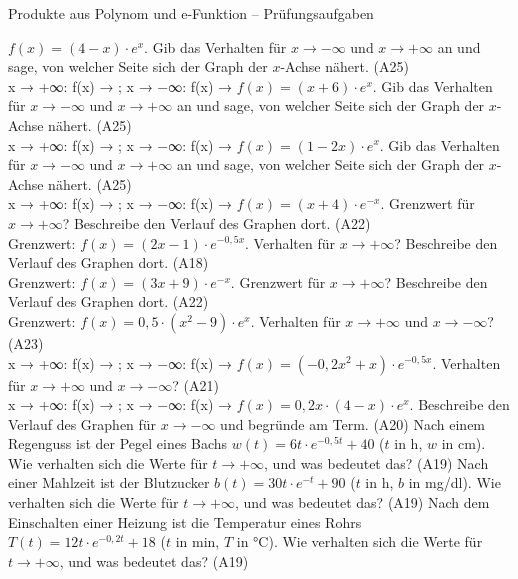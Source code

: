 \begin{aufgabe}{Produkte aus Polynom und e-Funktion – Prüfungsaufgaben}
\begin{teile}
\teil $f(x) = (4 - x) \cdot e^{x}$. Gib das Verhalten für $x \to -\infty$ und $x \to +\infty$ an und sage, von welcher Seite sich der Graph der $x$-Achse nähert. \hfill (A25) \\ x → +∞: f(x) → \leerfeld ; x → −∞: f(x) → \leerfeld
\teil $f(x) = (x + 6) \cdot e^{x}$. Gib das Verhalten für $x \to -\infty$ und $x \to +\infty$ an und sage, von welcher Seite sich der Graph der $x$-Achse nähert. \hfill (A25) \\ x → +∞: f(x) → \leerfeld ; x → −∞: f(x) → \leerfeld
\teil $f(x) = (1 - 2x) \cdot e^{x}$. Gib das Verhalten für $x \to -\infty$ und $x \to +\infty$ an und sage, von welcher Seite sich der Graph der $x$-Achse nähert. \hfill (A25) \\ x → +∞: f(x) → \leerfeld ; x → −∞: f(x) → \leerfeld
\teil $f(x) = (x + 4) \cdot e^{-x}$. Grenzwert für $x \to +\infty$? Beschreibe den Verlauf des Graphen dort. \hfill (A22) \\ Grenzwert: \leerfeld
\teil $f(x) = (2x - 1) \cdot e^{-0{,}5x}$. Verhalten für $x \to +\infty$? Beschreibe den Verlauf des Graphen dort. \hfill (A18) \\ Grenzwert: \leerfeld
\teil $f(x) = (3x + 9) \cdot e^{-x}$. Grenzwert für $x \to +\infty$? Beschreibe den Verlauf des Graphen dort. \hfill (A22) \\ Grenzwert: \leerfeld
\teil $f(x) = 0{,}5 \cdot (x^2 - 9) \cdot e^{x}$. Verhalten für $x \to +\infty$ und $x \to -\infty$? \hfill (A23) \\ x → +∞: f(x) → \leerfeld ; x → −∞: f(x) → \leerfeld
\teil $f(x) = (-0{,}2x^2 + x) \cdot e^{-0{,}5x}$. Verhalten für $x \to +\infty$ und $x \to -\infty$? \hfill (A21) \\ x → +∞: f(x) → \leerfeld ; x → −∞: f(x) → \leerfeld
\teil $f(x) = 0{,}2x \cdot (4 - x) \cdot e^{x}$. Beschreibe den Verlauf des Graphen für $x \to -\infty$ und begründe am Term. \hfill (A20)
\teil Nach einem Regenguss ist der Pegel eines Bachs $w(t) = 6t \cdot e^{-0{,}5t} + 40$ ($t$ in h, $w$ in cm). Wie verhalten sich die Werte für $t \to +\infty$, und was bedeutet das? \hfill (A19)
\teil Nach einer Mahlzeit ist der Blutzucker $b(t) = 30t \cdot e^{-t} + 90$ ($t$ in h, $b$ in mg/dl). Wie verhalten sich die Werte für $t \to +\infty$, und was bedeutet das? \hfill (A19)
\teil Nach dem Einschalten einer Heizung ist die Temperatur eines Rohrs $T(t) = 12t \cdot e^{-0{,}2t} + 18$ ($t$ in min, $T$ in °C). Wie verhalten sich die Werte für $t \to +\infty$, und was bedeutet das? \hfill (A19)
\end{teile}
\end{aufgabe}

